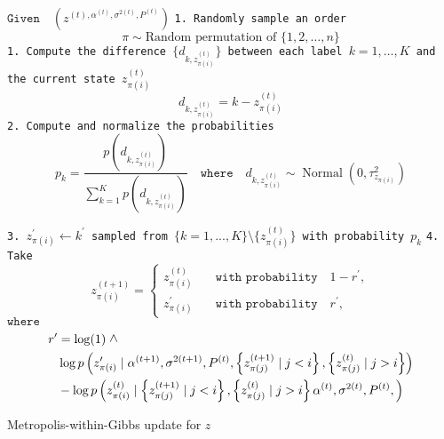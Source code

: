 \documentclass[11pt]{amsart}
\newcommand{\vertg}{\rotatebox{90}{$>$}}
\begin{document}
\begin{algorithm}
\begin{algorithmic}[t]
\State $\texttt{Given} \quad \left(z^{(t),\alpha^{(t)},\sigma^{2(t)},P^{(t)}}\right)  $
\State
\State \texttt{1. Randomly sample an order} \begin{equation}\label{eqn_random_order}
\pi \sim \text{Random permutation of } \{1,2,\ldots,n\} \nonumber
\end{equation}
    \State \texttt{1. Compute the difference $\{d_{k,z_{\pi(i)}^{(t)}}\}$ between each label $k=1,\ldots,K$ and the current state $z_{\pi(i)}^{(t)}$}
    \begin{equation}\label{eqn:actual_proposal}
d_{k,z_{\pi(i)}^{(t)}} =  k - z_{\pi(i)}^{(t)}  \nonumber
\end{equation}
    \State \texttt{2. Compute and normalize the probabilities}
    \begin{equation}\label{eqn:adjusted_probabilities}
p_{k} = \frac{p \left( d_{k,z_{\pi(i)}^{(t)}} \right) }{\sum_{k=1}^Kp \left( d_{k,z_{\pi(i)}^{(t)}} \right) }  \quad \texttt{where} \quad d_{k,z_{\pi(i)}^{(t)}} \sim \operatorname{Normal}\left( 0, \tau^2_{z_{\pi(i)}} \right) \nonumber
\end{equation}
    
    \State \texttt{3. $z^{\prime}_{\pi(i)} \gets k^{\prime}$ sampled from $\{ k = 1,...,K \} \setminus \{ z_{\pi(i)}^{(t)} \}$ with probability $p_k$} 
    \State \texttt{4. Take} \begin{equation}\label{eqn_acc_reject_z}
    z^{(t+1)}_{\pi(i)} = 
    \begin{cases}
    z^{(t)}_{\pi(i)} \quad &\texttt{with probability} \quad 1 - r^\prime, \\
    z^{\prime}_{\pi(i)} \quad &\texttt{with probability} \quad r^\prime,
    \end{cases}\nonumber
    \end{equation}
    \State $\texttt{where}$ \begin{align}\label{eqn:z_ratio}
    r^\prime &= \log(1) \ \vertg \nonumber \\ 
    &\log{p \left(z^{\prime}_{\pi(i)} \mid \alpha^{(t+1)},\sigma^{2(t+1)},P^{(t)}, \left\{ z_{\pi(j)}^{(t+1)} \mid j < i \right\} , \left\{ z_{\pi(j)}^{(t)} \mid j > i \right\} \right)}    \\ 
    &- \log{p \left(z^{(t)}_{\pi(i)} \mid \left\{ z_{\pi(j)}^{(t+1)} \mid j < i \right\}, \left\{ z_{\pi(j)}^{(t)} \mid j > i \right\} \alpha^{(t)},\sigma^{2(t)},P^{(t)},  \right)}  \nonumber
    \end{align}
\EndFor
\end{algorithmic}
\caption{Metropolis-within-Gibbs update for \(z\)}
\label{alg_general_algorithm_z}
\end{algorithm}
\end{document}
